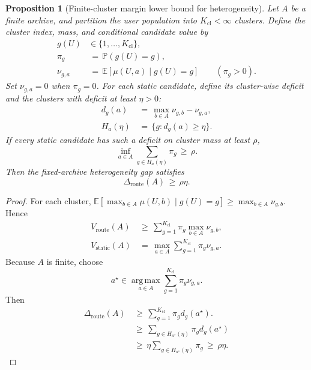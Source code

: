 \documentclass{article} %
\newtheorem{proposition}[theorem]{Proposition}
\begin{document}
\begin{proposition}[Finite-cluster margin lower bound for heterogeneity]
\label{prop:13}
Let \(A\) be a finite archive, and partition the user population into
\(K_{\mathrm{cl}}<\infty\) clusters. Define the cluster index, mass, and
conditional candidate value by
\begin{align}
\label{eq:app-fifth-cluster-set}
g(U)
&\in\{1,\ldots,K_{\mathrm{cl}}\},
\\
\label{eq:app-fifth-cluster-mass}
\pi_g
&\,=\,
\mathbb{P}(g(U)=g),
\\
\label{eq:app-fifth-cluster-value}
\nu_{g,a}
&\,=\,
\mathbb{E}[\mu(U,a)\mid g(U)=g]
\qquad(\pi_g>0).
\end{align}
Set \(\nu_{g,a}=0\) when \(\pi_g=0\). For each static candidate, define its
cluster-wise deficit and the clusters with deficit at least \(\eta>0\):
\begin{align}
\label{eq:app-fifth-missed-value}
d_g(a)
&\,=\,
\max_{b\in A}\nu_{g,b}-\nu_{g,a},
\\
\label{eq:app-fifth-margin-set}
H_a(\eta)
&\,=\,
\{g:d_g(a)\geq\eta\}.
\end{align}
If every static candidate has such a deficit on cluster mass at least
\(\rho\),
\begin{equation}
\label{eq:app-fifth-margin-condition}
\inf_{a\in A}
\sum_{g\in H_a(\eta)}\pi_g
\,\ge\,
\rho.
\end{equation}
Then the fixed-archive heterogeneity gap satisfies
\begin{equation}
\label{eq:app-fifth-margin-gap}
\Delta_{\mathrm{route}}(A)
\,\ge\,
\rho\eta.
\end{equation}
\end{proposition}

\begin{proof}
For each cluster,
\(\mathbb E[\max_{b\in A}\mu(U,b)\mid g(U)=g]
\geq\max_{b\in A}\nu_{g,b}\). Hence
\begin{align}
\label{eq:app-fifth-cluster-route}
V_{\mathrm{route}}(A)
&\,\geq\,
\sum_{g=1}^{K_{\mathrm{cl}}}\pi_g\max_{b\in A}\nu_{g,b},
\\
\label{eq:app-fifth-cluster-static}
V_{\mathrm{static}}(A)
&\,=\,
\max_{a\in A}\sum_{g=1}^{K_{\mathrm{cl}}}\pi_g\nu_{g,a}.
\end{align}
Because \(A\) is finite, choose
\begin{equation}
\label{eq:app-fifth-static-maximizer}
a^\star
\in
\operatorname*{arg\,max}_{a\in A}
\sum_{g=1}^{K_{\mathrm{cl}}}\pi_g\nu_{g,a}.
\end{equation}
Then
\begin{equation}
\label{eq:app-fifth-margin-proof-delta}
\begin{aligned}
\Delta_{\mathrm{route}}(A)
&\,\ge\,
\sum_{g=1}^{K_{\mathrm{cl}}}\pi_g d_g(a^\star).
\\
&\,\geq\,
\sum_{g\in H_{a^\star}(\eta)}
\pi_g d_g(a^\star)
\\
&\,\geq\,
\eta\sum_{g\in H_{a^\star}(\eta)}\pi_g
\,\geq\,
\rho\eta.
\end{aligned}
\end{equation}
\end{proof}
\end{document}
